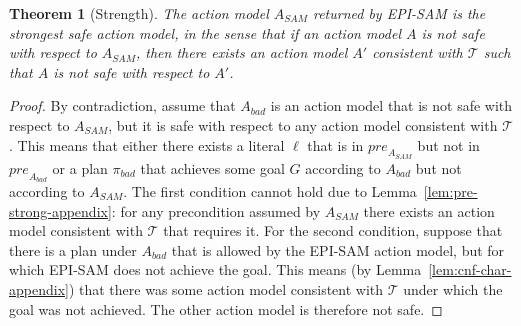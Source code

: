 \documentclass{article}
\theoremstyle{plain}
\newtheorem{theorem}{Theorem}[section]
\theoremstyle{definition}
\theoremstyle{remark}
\theoremstyle{observation}
\newcommand{\pre}{\textit{pre}}
\newcommand{\sam}{\textit{SAM}\xspace}
\newcommand{\ispre}{\textit{IsPre}}
\begin{document}

\begin{theorem}[Strength]
The action model $A_\sam$ returned by EPI-SAM is the strongest safe action model, 
in the sense that if an action model $A$ is not safe with respect to $A_\sam$, 
then there exists an action model $A'$ consistent with $\mathcal{T}$ 
such that $A$ is not safe with respect to $A'$. 
\end{theorem}
\begin{proof}
By contradiction, assume that $A_{bad}$ is an action model that is not safe with respect to $A_{\sam}$, but it is safe with respect to any action model consistent with $\mathcal{T}$.   
This means that either there exists a literal $\ell$ that is in 
$\pre_{A_\sam}$ but not in $\pre_{A_{bad}}$ 
or a plan $\pi_{bad}$ that 
achieves some goal $G$ according to $A_{bad}$ but not according to $A_\sam$. 
The first condition cannot hold due to Lemma~\ref{lem:pre-strong-appendix}: for any precondition assumed by $A_\sam$ there exists an action model consistent with $\mathcal{T}$ that requires it. 
For the second condition, suppose that there is a plan under $A_{bad}$ that is allowed by the EPI-SAM action model, but for which EPI-SAM does not achieve the goal. This means (by Lemma~\ref{lem:cnf-char-appendix}) that there was some action model consistent with $\mathcal{T}$ under which the goal was not achieved. The other action model is therefore not safe.
%
\end{proof}
\end{document}

